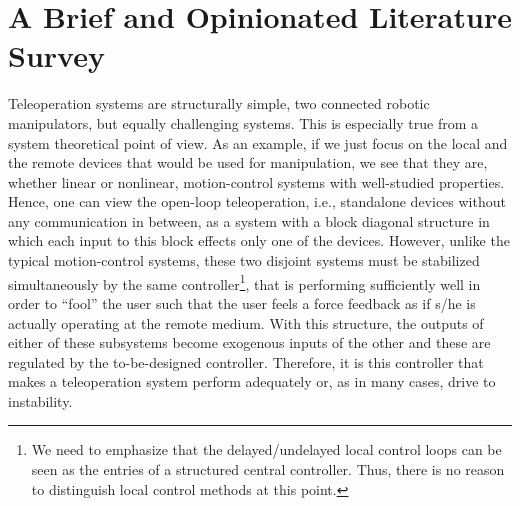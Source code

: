 
\chapter{A Brief and Opinionated Literature Survey}\label{chap:litsurvey}

Teleoperation systems are structurally simple, two connected robotic manipulators, but equally challenging 
systems. This is especially true from a system theoretical point of view. As an example, 
if we just focus on the local and the remote devices that would be used for manipulation, 
we see that they are, whether linear or nonlinear, motion-control systems with well-studied 
properties. Hence, one can view the open-loop teleoperation, i.e., standalone devices without any communication
in between, as a system with a block diagonal structure in which each input to this block effects only one 
of the devices. However, unlike the typical motion-control systems, these two disjoint 
systems must be stabilized simultaneously by the same controller\footnote{We need to emphasize 
that the delayed/undelayed local control loops can be seen as the entries of a structured 
central controller. Thus, there is no reason to distinguish local control methods at this 
point.}, that is performing sufficiently well in order to \enquote{fool} the user such that the 
user feels a force feedback as if s/he is actually operating at the remote medium. With this 
structure, the outputs of either of these subsystems become exogenous inputs of the other 
and these are regulated by the to-be-designed controller. Therefore, it is this controller 
that makes a teleoperation system perform adequately or, as in many cases, drive to instability.


